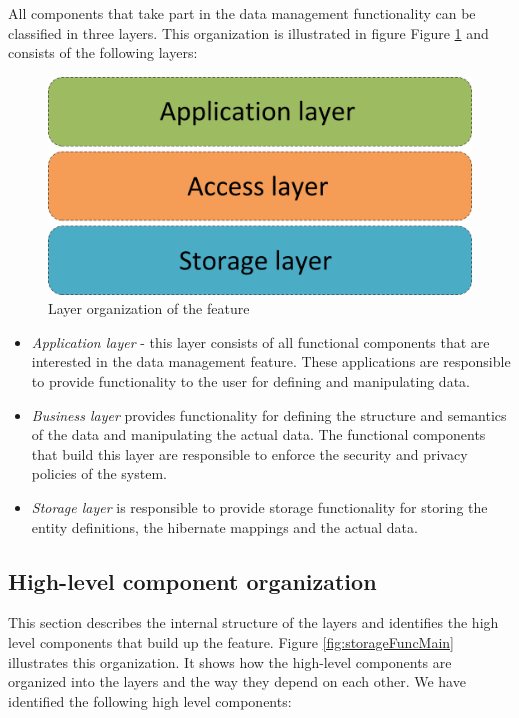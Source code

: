 All components that take part in the data management functionality can be classified in three layers. This organization is illustrated in figure Figure \ref{fig:storageLayers} and consists of the following layers:

\begin{figure}[h!]
  \centering
  	\includegraphics[scale=0.4]{storage/functional/layers.png}
  \caption{Layer organization of the feature}
  \label{fig:storageLayers}
\end{figure}

\begin{itemize}
	\item \textit{Application layer} - this layer consists of all functional components that are interested in the data management feature. These applications are responsible to provide functionality to the user for defining and manipulating data.
	
	\item \textit{Business layer} provides functionality for defining the structure and semantics of the data and manipulating the actual data. The functional components that build this layer are responsible to enforce the security and privacy policies of the system.
	
	\item \textit{Storage layer } is responsible to provide storage functionality for storing the entity definitions, the hibernate mappings and the actual data.
\end{itemize}

\subsection{High-level component organization}
This section describes the internal structure of the layers and identifies the high level components that build up the feature. Figure \ref{fig:storageFuncMain} illustrates this organization. It shows how the high-level components are organized into the layers and the way they depend on each other. We have identified the following high level components:


